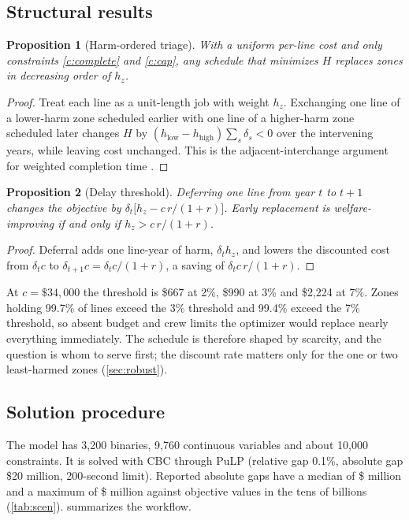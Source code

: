\documentclass[11pt]{article}
\newtheorem{proposition}{Proposition}
\begin{document}
\subsection{Structural results}
\begin{proposition}[Harm-ordered triage]\label{prop:smith}
With a uniform per-line cost and only constraints \eqref{c:complete} and \eqref{c:cap}, any schedule
that minimizes $H$ replaces zones in decreasing order of $h_z$.
\end{proposition}
\begin{proof}
Treat each line as a unit-length job with weight $h_z$. Exchanging one line of a lower-harm zone
scheduled earlier with one line of a higher-harm zone scheduled later changes $H$ by
$(h_{\text{low}}-h_{\text{high}})\sum_{s}\delta_s<0$ over the intervening years, while leaving cost
unchanged. This is the adjacent-interchange argument for weighted completion time
\citep{smith1956}.
\end{proof}

\begin{proposition}[Delay threshold]\label{prop:delay}
Deferring one line from year $t$ to $t+1$ changes the objective by
$\delta_t\bigl[h_z-c\,r/(1+r)\bigr]$. Early replacement is welfare-improving if and only if
$h_z>c\,r/(1+r)$.
\end{proposition}
\begin{proof}
Deferral adds one line-year of harm, $\delta_th_z$, and lowers the discounted cost from $\delta_tc$
to $\delta_{t+1}c=\delta_tc/(1+r)$, a saving of $\delta_tc\,r/(1+r)$.
\end{proof}
At $c=\$34{,}000$ the threshold is \$667 at 2\%, \$990 at 3\% and \$2,224 at 7\%. Zones holding
99.7\% of lines exceed the 3\% threshold and 99.4\% exceed the 7\% threshold, so absent budget and
crew limits the optimizer would replace nearly everything immediately. The schedule is therefore
shaped by scarcity, and the question is whom to serve first; the discount rate matters only for the
one or two least-harmed zones (\cref{sec:robust}).

\subsection{Solution procedure}
The model has 3,200 binaries, 9,760 continuous variables and about 10,000 constraints. It is solved
with CBC through PuLP \citep{mitchell2011pulp} (relative gap 0.1\%, absolute gap \$20 million,
200-second limit). Reported absolute gaps have a median of \$\MedGapMusd{} million and a maximum of
\$\MaxGapMusd{} million against objective values in the tens of billions (\cref{tab:scen}).
 summarizes the workflow.
\end{document}

